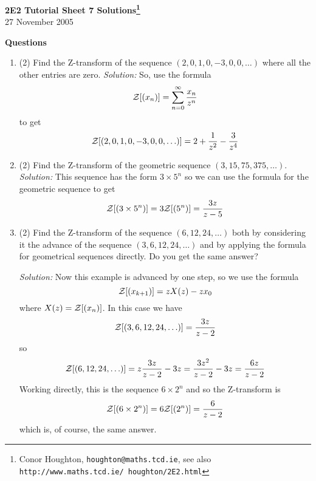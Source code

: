 \documentclass[12pt]{article}
\newcommand\soln{\noindent\textit{Solution:} }
\begin{document}
\begin{center}
{\bf 2E2 Tutorial Sheet 7 Solutions\footnote{Conor Houghton, {\tt houghton@maths.tcd.ie}, see also {\tt http://www.maths.tcd.ie/ houghton/2E2.html}}}\\[1cm] 27 November 2005
\end{center}
{
{\bf Questions}
\begin{enumerate}
\item (2) Find the Z-transform of the sequence $(2,0,1,0,-3,0,0,\ldots)$  where all the other entries are zero. 
\vskip 1cm
\soln So, use the formula
\begin{equation}
{\cal Z}[(x_n)]=\sum_{n=0}^\infty{\frac{x_n}{z^n}}
\end{equation}
to get
\begin{equation}
{\cal Z}[(2,0,1,0,-3,0,0,\ldots)]=2+\frac{1}{z^2}-\frac{3}{z^4}
\end{equation}
\vskip 1cm
\item (2) Find the Z-transform of the geometric sequence $(3,15,75,375,\ldots)$. 
\vskip 1cm
\soln This sequence has the form $3\times 5^n$ so we can use the
formula for the geometric sequence to get
\begin{equation}
{\cal Z}[(3\times 5^n)]=3{\cal Z}[(5^n)]=\frac{3z}{z-5}
\end{equation}
\vskip 1cm
\item (2) Find the Z-transform of the sequence $(6,12,24,\ldots)$ both
by considering it the advance of the sequence $(3,6,12,24,\ldots)$ and
by applying the formula for geometrical sequences directly. Do you get
the same answer?

\soln Now this example is advanced by one step, so we use the formula
\begin{equation}
{\cal Z}[(x_{k+1})]=zX(z)-zx_0
\end{equation}
where $X(z)={\cal Z}[(x_{n})]$. In this case we have
\begin{equation}
{\cal Z}[(3,6,12,24,\ldots)]=\frac{3z}{z-2}
\end{equation}
so
\begin{equation}
{\cal Z}[(6,12,24,\ldots)]=z\frac{3z}{z-2}-3z=\frac{3z^2}{z-2}-3z=\frac{6z}{z-2}\end{equation}
Working directly, this is the sequence $6\times 2^n$ and so the Z-transform is
\begin{equation}
{\cal Z}[(6\times 2^n)]=6{\cal Z}[(2^n)]=\frac{6}{z-2}
\end{equation}
which is, of course, the same answer.




\end{enumerate}}
\end{document}
